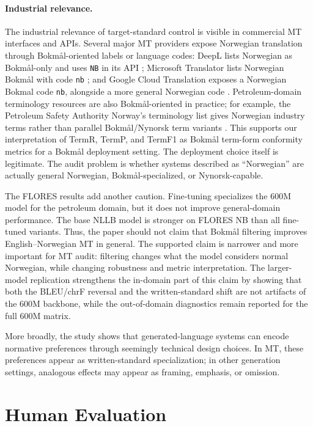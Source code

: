 \documentclass[11pt]{article}
\newcommand{\nb}{Bokm{\aa}l}
\newcommand{\nn}{Nynorsk}
\begin{document}
\paragraph{Industrial relevance.}
The industrial relevance of target-standard control is visible in commercial MT interfaces and APIs. Several major MT providers expose Norwegian translation through \nb{}-oriented labels or language codes: DeepL lists Norwegian as \nb{}-only and uses \texttt{NB} in its API \cite{deepl-languages,deepl-help-languages}; Microsoft Translator lists Norwegian \nb{} with code \texttt{nb} \cite{microsoft-translator-languages}; and Google Cloud Translation exposes a Norwegian Bokmal code \texttt{nb}, alongside a more general Norwegian code \cite{google-translate-languages}. Petroleum-domain terminology resources are also \nb{}-oriented in practice; for example, the Petroleum Safety Authority Norway's terminology list gives Norwegian industry terms rather than parallel \nb{}/\nn{} term variants \cite{havtil-terms}. This supports our interpretation of TermR, TermP, and TermF1 as \nb{} term-form conformity metrics for a \nb{} deployment setting. The deployment choice itself is legitimate. The audit problem is whether systems described as ``Norwegian'' are actually general Norwegian, \nb{}-specialized, or \nn{}-capable.

The FLORES results add another caution. Fine-tuning specializes the 600M model for the petroleum domain, but it does not improve general-domain performance. The base NLLB model is stronger on FLORES NB than all fine-tuned variants. Thus, the paper should not claim that \nb{} filtering improves English--Norwegian MT in general. The supported claim is narrower and more important for MT audit: filtering changes what the model considers normal Norwegian, while changing robustness and metric interpretation. The larger-model replication strengthens the in-domain part of this claim by showing that both the BLEU/chrF reversal and the written-standard shift are not artifacts of the 600M backbone, while the out-of-domain diagnostics remain reported for the full 600M matrix.

More broadly, the study shows that generated-language systems can encode normative preferences through seemingly technical design choices. In MT, these preferences appear as written-standard specialization; in other generation settings, analogous effects may appear as framing, emphasis, or omission.

\section{Human Evaluation}
\end{document}
